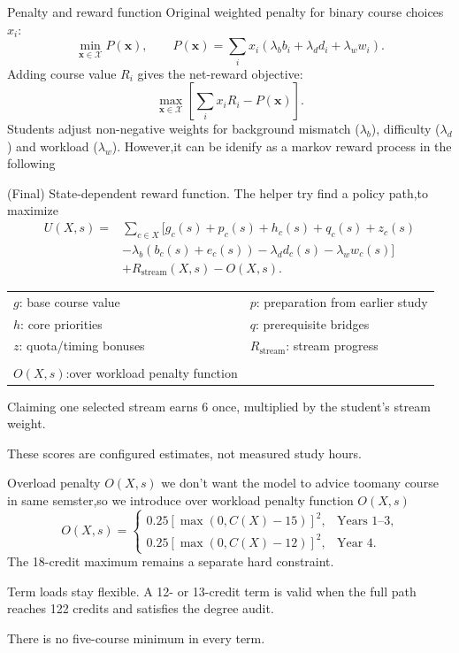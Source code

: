\documentclass[aspectratio=169,11pt]{beamer}
\newcommand{\smallnote}[1]{\par{\footnotesize\color{muted}#1\par}}
\begin{document}
\begin{frame}{Penalty and reward function}
Original weighted penalty for binary course choices $x_i$:
\[
\min_{\mathbf x\in\mathcal X}P(\mathbf x),\qquad
P(\mathbf x)=\sum_i x_i(\lambda_b b_i+\lambda_d d_i+\lambda_w w_i).
\]
Adding course value $R_i$ gives the net-reward objective:
\[
\max_{\mathbf x\in\mathcal X}\left[\sum_i x_iR_i-P(\mathbf x)\right].
\]
\vspace{1mm}
Students adjust non-negative weights for background mismatch ($\lambda_b$), difficulty ($\lambda_d$) and workload ($\lambda_w$).
However,it can be idenify as a markov reward process in the following
\end{frame}

\begin{frame}{(Final) State-dependent reward function. }
The helper try find a policy path,to maximize
\begin{align*}
U(X,s)={}&\sum_{c\in X}\bigl[g_c(s)+p_c(s)+h_c(s)+q_c(s)+z_c(s)\\
 &-\lambda_b(b_c(s)+e_c(s))-\lambda_d d_c(s)-\lambda_w w_c(s)\bigr]\\
 &+R_{\mathrm{stream}}(X,s)-O(X,s).
\end{align*}
\begin{tabular}{L{6.2cm}L{6cm}}
$g$: base course value & $p$: preparation from earlier study\\
$h$: core priorities & $q$: prerequisite bridges\\
$z$: quota/timing bonuses & $R_{\mathrm{stream}}$: stream progress\\
\\$O(X,s)$:over workload penalty function
\end{tabular}\par
\vspace{2mm}
Claiming one selected stream earns 6 once, multiplied by the student's stream weight.
\smallnote{These scores are configured estimates, not measured study hours.}
\end{frame}

\begin{frame}{Overload penalty $O(X,s)$}
we don't want the model to advice toomany course in same semster,so we introduce  over workload penalty function $O(X,s)$ 
\[
O(X,s)=\begin{cases}
0.25[\max(0,C(X)-15)]^2,&\text{Years 1--3},\\[6pt]
0.25[\max(0,C(X)-12)]^2,&\text{Year 4}.
\end{cases}
\]
\vspace{3mm}
The 18-credit maximum remains a separate hard constraint.

Term loads stay flexible. A 12- or 13-credit term is valid when the full path reaches 122 credits and satisfies the degree audit.
\smallnote{There is no five-course minimum in every term.}
\end{frame}
\end{document}

